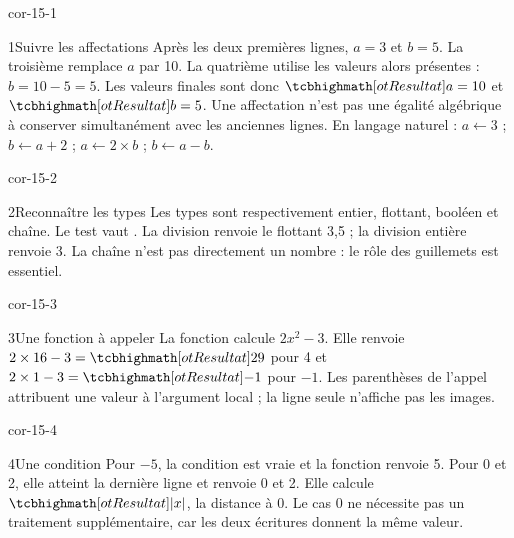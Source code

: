 \clearpage\pagestyle{otMain}\fontsize{11}{15}\selectfont
{}
\begin{blocLivre}{cor-15-1}
\begin{corrige}{1}{Suivre les affectations}
Après les deux premières lignes, $a=3$ et $b=5$. La troisième remplace $a$ par 10. La quatrième utilise les valeurs alors présentes : $b=10-5=5$. Les valeurs finales sont donc $\res{a=10}$ et $\res{b=5}$. Une affectation n’est pas une égalité algébrique à conserver simultanément avec les anciennes lignes. En langage naturel : $a\leftarrow3$ ; $b\leftarrow a+2$ ; $a\leftarrow2\times b$ ; $b\leftarrow a-b$.
\end{corrige}
\end{blocLivre}
\begin{blocLivre}{cor-15-2}
\begin{corrige}{2}{Reconnaître les types}
Les types sont respectivement entier, flottant, booléen et chaîne. Le test  vaut . La division  renvoie le flottant 3,5 ; la division entière  renvoie 3. La chaîne  n’est pas directement un nombre : le rôle des guillemets est essentiel.
\end{corrige}
\end{blocLivre}
\begin{blocLivre}{cor-15-3}
\begin{corrige}{3}{Une fonction à appeler}
La fonction calcule $2x^2-3$. Elle renvoie $2\times16-3=\res{29}$ pour 4 et $2\times1-3=\res{-1}$ pour $-1$. Les parenthèses de l’appel attribuent une valeur à l’argument local  ; la ligne  seule n’affiche pas les images.
\end{corrige}
\end{blocLivre}
\begin{blocLivre}{cor-15-4}
\begin{corrige}{4}{Une condition}
Pour $-5$, la condition est vraie et la fonction renvoie 5. Pour 0 et 2, elle atteint la dernière ligne et renvoie 0 et 2. Elle calcule $\res{|x|}$, la distance à 0. Le cas 0 ne nécessite pas un traitement supplémentaire, car les deux écritures donnent la même valeur.
\end{corrige}
\end{blocLivre}
